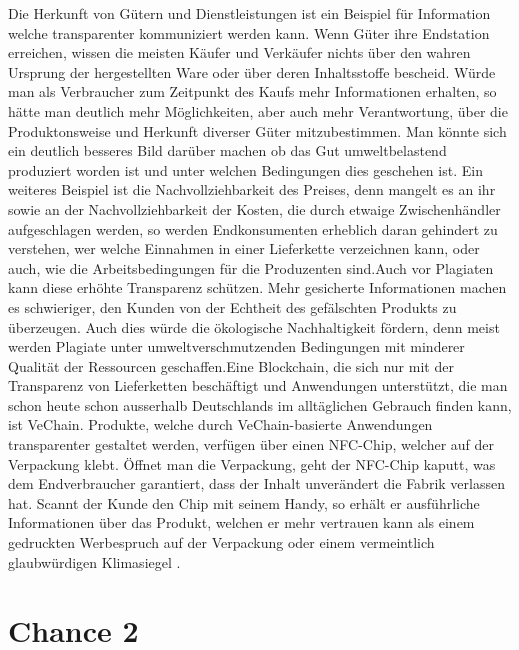 Die Herkunft von Gütern und Dienstleistungen ist ein Beispiel für Information welche transparenter kommuniziert werden kann. Wenn Güter ihre Endstation erreichen, wissen die meisten Käufer und Verkäufer nichts über den wahren Ursprung der hergestellten Ware oder über deren Inhaltsstoffe bescheid. Würde man als Verbraucher zum Zeitpunkt des Kaufs mehr Informationen erhalten, so hätte man deutlich mehr Möglichkeiten, aber auch mehr Verantwortung, über die Produktonsweise und Herkunft diverser Güter mitzubestimmen. Man könnte sich ein deutlich besseres Bild darüber machen ob das Gut umweltbelastend produziert worden ist und unter welchen Bedingungen dies geschehen ist. \newline Ein weiteres Beispiel ist die Nachvollziehbarkeit des Preises, denn mangelt es an ihr sowie an der Nachvollziehbarkeit der Kosten, die durch etwaige Zwischenhändler aufgeschlagen werden, so werden Endkonsumenten erheblich daran gehindert zu verstehen, wer welche Einnahmen in einer Lieferkette verzeichnen kann, oder auch, wie die Arbeitsbedingungen für die Produzenten sind\cite{lieferkette}.\newline Auch vor Plagiaten kann diese erhöhte Transparenz schützen. Mehr gesicherte Informationen machen es schwieriger, den Kunden von der Echtheit des gefälschten Produkts zu überzeugen. Auch dies würde die ökologische Nachhaltigkeit fördern, denn meist werden Plagiate unter umweltverschmutzenden Bedingungen mit minderer Qualität der Ressourcen geschaffen.\newline Eine Blockchain, die sich nur mit der Transparenz von Lieferketten beschäftigt und Anwendungen unterstützt, die man schon heute schon ausserhalb Deutschlands im alltäglichen Gebrauch finden kann, ist VeChain. Produkte, welche durch VeChain-basierte Anwendungen transparenter gestaltet werden, verfügen über einen NFC-Chip, welcher auf der Verpackung klebt. Öffnet man die Verpackung, geht der NFC-Chip kaputt, was dem Endverbraucher garantiert, dass der Inhalt unverändert die Fabrik verlassen hat. Scannt der Kunde den Chip mit seinem Handy, so erhält er ausführliche Informationen über das Produkt, welchen er mehr vertrauen kann als einem gedruckten Werbespruch auf der Verpackung oder einem vermeintlich glaubwürdigen Klimasiegel \cite{vechain}\cite{veDoc}.
\section{Chance 2}

